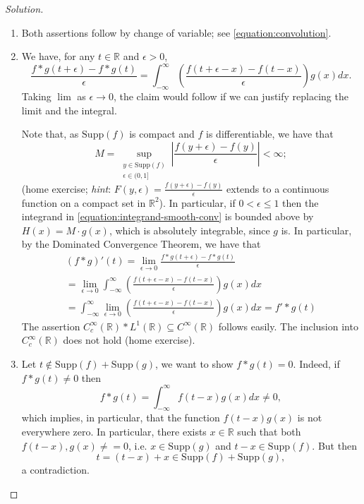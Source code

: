 \documentclass[12pt, draft,reqno,a4paper, twoside]{amsproc}
\newcommand{\supp}{\mathrm{Supp}}
\newcommand{\dbR}{\mathbb R}
\newcommand{\abs}[1]{\left|#1\right|}
\begin{document}
\begin{proof}[\it Solution]
\begin{enumerate}
\item Both assertions follow by change of variable; see \eqref{equation:convolution}.
\item We have, for any $t\in \dbR$ and $\epsilon>0$, 
\begin{equation}\label{equation:integrand-smooth-conv}
\frac{f\ast g(t+\epsilon)-f\ast g(t)}{\epsilon}=\int_{-\infty}^\infty \left(\frac{f(t+\epsilon-x)-f(t-x)}{\epsilon}\right)g(x)dx.
\end{equation}
Taking $\lim$ as $\epsilon\to 0$, the claim would follow if we can justify replacing the limit and the integral. 

Note that, as $\supp(f)$ is compact and $f$ is differentiable, we have that 
\[M=\sup_{\substack{y\in\supp (f)\\\epsilon\in (0,1]}}\abs{\frac{f(y+\epsilon)-f(y)}{\epsilon}}<\infty;\]
(home exercise; \textit{hint}: $F(y,\epsilon)=\frac{f(y+\epsilon)-f(y)}{\epsilon}$ extends to a continuous function on a compact set in $\dbR^2$). In particular, if $0<\epsilon\le 1$ then the integrand in \eqref{equation:integrand-smooth-conv} is bounded above by $H(x)=M\cdot g(x)$, which is absolutely integrable, since $g$ is. In particular, by the Dominated Convergence Theorem, we have that 
\begin{multline*}(f\ast g)'(t)=\lim_{\epsilon\to 0}\frac{f\ast g(t+\epsilon)-f\ast g(t)}{\epsilon}\\
=\lim_{\epsilon\to 0}\int_{-\infty}^\infty\left(\frac{f(t+\epsilon-x)-f(t-x)}{\epsilon}\right)g(x)dx\\=\int_{-\infty}^\infty\lim_{\epsilon\to 0}
\left(\frac{f(t+\epsilon-x)-f(t-x)}{\epsilon}\right)g(x)dx=f'\ast g(t)
\end{multline*}
The assertion $C_c^\infty(\dbR)\ast L^1(\dbR)\subseteq C^\infty(\dbR)$ follows easily. The inclusion into $C^\infty_c(\dbR)$ does not hold (home exercise).%
\item Let $t\notin \supp(f)+\supp(g)$, we want to show $f\ast g(t)=0$. Indeed, if $f\ast g(t)\ne 0$ then
\[f\ast g(t)=\int_{-\infty}^\infty f(t-x)g(x)dx\ne 0,\]
which implies, in particular, that the function $f(t-x)g(x)$ is not everywhere zero. In particular, there exists $x\in \dbR$ such that both $f(t-x),g(x)\ne =0$, i.e. $x\in \supp(g)$ and $t-x\in\supp (f)$. But then
\[t=(t-x)+x\in \supp(f)+\supp(g),\]
a contradiction. 


\end{enumerate}
\end{proof}
\end{document}
